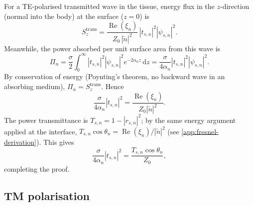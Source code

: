 \documentclass[11pt,a4paper]{article}
\theoremstyle{definition}      %
\newcommand{\diff}{\mathrm{d}}        %
\begin{document}
For a TE-polarised transmitted wave in the tissue, energy flux in the
$z$-direction (normal into the body) at the surface ($z = 0$) is
\begin{equation}
  S_z^{\mathrm{trans}} =
  \frac{\operatorname{Re}(\xi_n)}{Z_0\,|\tilde{n}|^2}\,|t_{s,n}|^2
  |\psi_{s,n}|^2.
\end{equation}
Meanwhile, the power absorbed per unit surface area from this wave is
\begin{equation}
  \Pi_n = \frac{\sigma}{2}\int_0^\infty |t_{s,n}|^2|\psi_{s,n}|^2
  e^{-2\alpha_n z}\,\diff z
  = \frac{\sigma}{4\alpha_n}|t_{s,n}|^2|\psi_{s,n}|^2.
\end{equation}
By conservation of energy (Poynting's theorem, no backward wave in
an absorbing medium), $\Pi_n = S_z^{\mathrm{trans}}$.  Hence
\begin{equation}
  \frac{\sigma}{4\alpha_n}|t_{s,n}|^2 = \frac{\operatorname{Re}(\xi_n)}{Z_0|\tilde{n}|^2}.
\end{equation}
The power transmittance is $T_{s,n} = 1 - |r_{s,n}|^2$; by the
same energy argument applied at the interface,
$T_{s,n}\cos\theta_n =
\operatorname{Re}(\xi_n)/|\tilde{n}|^2$
(see \cref{app:fresnel-derivation}).  This gives
\begin{equation}
  \frac{\sigma}{4\alpha_n}|t_{s,n}|^2
  = \frac{T_{s,n}\cos\theta_n}{Z_0},
\end{equation}
completing the proof.

\subsection*{TM polarisation}
\end{document}
